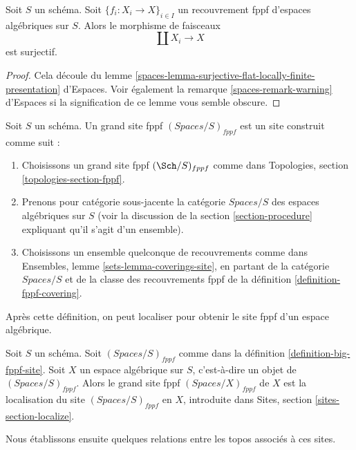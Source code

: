 \begin{lemma}
\label{lemma-fppf-covering-surjective}
Soit $S$ un schéma.
Soit $\{f_i : X_i \to X\}_{i \in I}$ un recouvrement fppf d'espaces algébriques
sur $S$. Alors le morphisme de faisceaux
$$
\coprod X_i \longrightarrow X
$$
est surjectif.
\end{lemma}

\begin{proof}
Cela découle du
lemme \ref{spaces-lemma-surjective-flat-locally-finite-presentation} d'Espaces.
Voir également
la remarque \ref{spaces-remark-warning} d'Espaces
si la signification de ce lemme vous semble obscure.
\end{proof}

\begin{definition}
\label{definition-big-fppf-site}
Soit $S$ un schéma. Un grand site fppf {\it $(\textit{Spaces}/S)_{fppf}$}
est un site construit comme suit :
\begin{enumerate}
\item Choisissons un grand site fppf $(\Sch/S)_{fppf}$ comme dans
Topologies, section \ref{topologies-section-fppf}.
\item Prenons pour catégorie sous-jacente la catégorie $\textit{Spaces}/S$
des espaces algébriques sur $S$ (voir la discussion de la
section \ref{section-procedure} expliquant qu'il s'agit d'un ensemble).
\item Choisissons un ensemble quelconque de recouvrements comme dans
Ensembles, lemme \ref{sets-lemma-coverings-site}, en partant de la
catégorie $\textit{Spaces}/S$ et de la classe des recouvrements fppf
de la définition \ref{definition-fppf-covering}.
\end{enumerate}
\end{definition}

\noindent
Après cette définition, on peut localiser pour obtenir le site fppf
d'un espace algébrique.

\begin{definition}
\label{definition-big-small-fppf}
Soit $S$ un schéma. Soit $(\textit{Spaces}/S)_{fppf}$ comme dans
la définition \ref{definition-big-fppf-site}.
Soit $X$ un espace algébrique sur $S$, c'est-à-dire un objet de
$(\textit{Spaces}/S)_{fppf}$. Alors le grand site fppf
{\it $(\textit{Spaces}/X)_{fppf}$} de $X$
est la localisation du site $(\textit{Spaces}/S)_{fppf}$
en $X$, introduite dans Sites, section \ref{sites-section-localize}.
\end{definition}

\noindent
Nous établissons ensuite quelques relations entre les topos
associés à ces sites.


